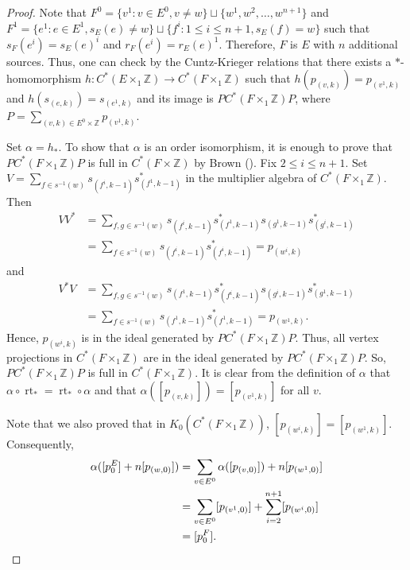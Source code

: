 \documentclass[12pt]{amsbook}%
\newcommand{\lt}{\operatorname{rt}}
\theoremstyle{defin}
\theoremstyle{remark}
\numberwithin{equation}{chapter}
\numberwithin{theor}{section}
\newcommand{\ZZ}{\mathbb{Z}}
\begin{document}
\begin{proof}
Note that $F^0 = \{ v^1 : v \in E^0 , v \neq w \} \sqcup \{ w^1, w^2, \ldots, w^{n+1} \}$ and $F^1 = \{ e^1 : e \in E^1, s_E(e) \neq w \} \sqcup \{ f^i : 1 \leq i \leq n+1, s_E(f) = w \}$ such that $s_F( e^i ) = s_E(e)^i$ and $r_F( e^i) = r_E(e)^1$.  Therefore, $F$ is $E$ with $n$ additional sources.  Thus, one can check by the Cuntz-Krieger relations that there exists a $*$-homomorphism 
$h \colon C^*(E \times_1 \ZZ ) \to C^*(F \times_1 \ZZ )$ such that $h( p_{(v,k)} ) = p_{(v^1, k)}$ and $h( s_{(e,k)} ) = s_{ (e^1, k) }$ and its image is $PC^*(F \times_1 \ZZ)P$, where $P = \sum_{(v,k) \in E^0 \times \ZZ } p_{( v^1, k)}$.

Set $\alpha = h_*$.  To show that $\alpha$ is an order isomorphism, it is enough to prove that $PC^*(F \times_1 \ZZ)P$ is full in $C^*(F \times \ZZ)$ by Brown (\cite{lgb:sihsc}).  Fix $2 \leq i \leq n+1$.  Set $V = \sum_{ f \in s^{-1}(w) } s_{(f^i, k-1)}s_{( f^1, k-1) }^*$ in the multiplier algebra of $C^*(F \times_1 \ZZ)$.  Then 
\begin{align*}
VV^* &= \sum_{ f, g \in s^{-1}(w) }  s_{(f^i, k-1)}s_{( f^1, k-1) }^*  s_{(g^1, k-1)}s_{( g^i, k-1) }^* \\
	&= \sum_{ f \in s^{-1} (w) }  s_{(f^i, k-1)} s_{(f^i,k-1)}^* = p_{( w^i, k) }
\end{align*}
and 
\begin{align*}
V^*V &= \sum_{ f, g \in s^{-1}(w) } s_{(f^1, k-1)}s_{( f^i, k-1) }^*  s_{(g^i, k-1)}s_{( g^1, k-1) }^* \\
	&= \sum_{ f \in s^{-1} (w) }  s_{(f^1, k-1)} s_{(f^1,k-1)}^* = p_{( w^1, k) }.
\end{align*}
Hence, $p_{( w^i, k) }$ is in the ideal generated by $PC^*(F \times_1 \ZZ)P$.  Thus, all vertex projections in $C^*(F\times_1 \ZZ)$ are in the ideal generated by $PC^*(F \times_1 \ZZ)P$.  So, $PC^*(F \times_1 \ZZ)P$ is full in $C^*(F \times_1 \ZZ )$.   It is clear from the definition of $\alpha$ that $\alpha \circ \lt_* = \lt_* \circ \alpha$ and that $\alpha ( [ p_{(v, k)} ] )= [ p_{(v^1,  k)} ]$ for all $v$. 

Note that we also proved that in $K_0( C^*(F \times_1 \ZZ ))$, $[p_{( w^i, k) }] = [ p_{( w^1, k) } ]$.  Consequently, 
\begin{align*}
\alpha ( [ p_0^E] + n [p_{(w,0)}] ) &= \sum_{ v \in E^0 } \alpha( [p_{(v,0)} ] ) + n [ p_{(w^1,0)} ] \\
	&=  \sum_{ v \in E^0 } [p_{(v^1,0)} ]  + \sum_{ i=2}^{n+1} [  p_{( w^i, 0) } ] \\
	&= [ p_0^F ].\qedhere
\end{align*}
\end{proof}
\end{document}
